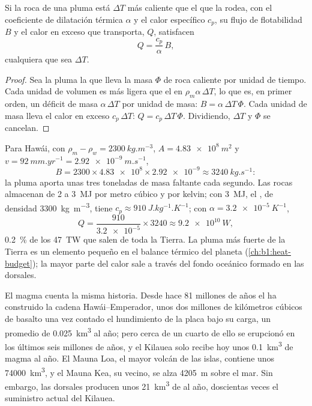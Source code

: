 \begin{proposition}\label{prop:b1:hotspots:heat}
Si la roca de una pluma está $\Delta T$ más caliente que el  que la rodea, con el coeficiente de dilatación térmica $\alpha$ y el calor
específico $c_p$, su flujo de flotabilidad $B$ y el calor en exceso que transporta, $Q$, satisfacen
\[
  Q = \frac{c_p}{\alpha}\,B ,
\]
cualquiera que sea $\Delta T$.
\end{proposition}

\begin{proof}
Sea la pluma la que lleva la masa $\Phi$ de roca caliente por unidad de tiempo. Cada unidad de volumen es más ligera que el  en
$\rho_m\alpha\,\Delta T$, lo que es, en primer orden, un déficit de masa $\alpha\,\Delta T$ por unidad de masa: $B =
\alpha\,\Delta T\,\Phi$. Cada
unidad de masa lleva el calor en exceso $c_p\,\Delta T$: $Q = c_p\,\Delta T\,\Phi$. Dividiendo, $\Delta T$ y $\Phi$ se cancelan.
\end{proof}

Para Hawái, con $\rho_m - \rho_w = \qty{2300}{kg.m^{-3}}$, $A =
\qty{4.83e8}{m^2}$ y $v = \qty{92}{mm.yr^{-1}} = \qty{2.92e-9}{m.s^{-1}}$,
\[
  B = 2300\times\num{4.83e8}\times\num{2.92e-9} \approx \qty{3240}{kg.s^{-1}}:
\]
la pluma aporta unas tres toneladas de masa faltante cada segundo. Las rocas almacenan de 2 a \qty{3}{MJ} por metro cúbico y por kelvin; con
\qty{3}{MJ}, el , de densidad \qty{3300}{kg.m^{-3}}, tiene
$c_p \approx \qty{910}{J.kg^{-1}.K^{-1}}$;
con $\alpha = \qty{3.2e-5}{K^{-1}}$,
\[
  Q = \frac{910}{\num{3.2e-5}}\times3240 \approx \qty{9.2e10}{W},
\]
\qty{0.2}{\percent} de los \qty{47}{TW} que salen de toda la Tierra. La pluma más fuerte de la Tierra es un elemento pequeño en el balance térmico
del planeta (\cref{ch:b1:heat-budget}); la mayor parte del calor sale a través del fondo oceánico formado en las dorsales.

El magma cuenta la misma historia. Desde hace 81 millones de años el  ha construido la cadena Hawái--Emperador, unos dos millones de
kilómetros cúbicos de basalto una vez contado el hundimiento de la placa bajo su carga, un promedio de \qty{0.025}{km^3} al año; pero cerca de un
cuarto de ello se erupcionó en los últimos seis millones de años, y el Kilauea solo recibe hoy unos \qty{0.1}{km^3} de magma al año. El Mauna Loa, el
mayor volcán de las islas, contiene unos \qty{74000}{km^3}, y el Mauna Kea, su vecino, se alza \qty{4205}{m} sobre el mar. Sin embargo, las dorsales
producen unos \qty{21}{km^3} de  al año, doscientas veces el suministro actual del Kilauea.

